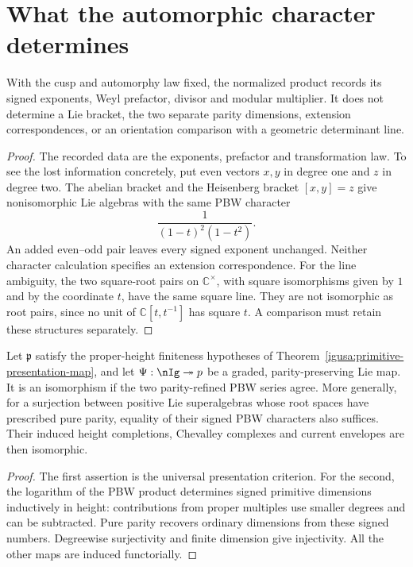 \section{What the automorphic character determines}
\begin{proposition}
With the cusp and automorphy law fixed, the normalized product
records its signed exponents, Weyl prefactor, divisor and modular
multiplier. It does not determine a Lie bracket, the two separate
parity dimensions, extension correspondences, or an orientation
comparison with a geometric determinant line.
\end{proposition}
\begin{proof}
The recorded data are the exponents, prefactor and transformation
law. To see the lost information concretely, put even vectors
\(x,y\) in degree one and \(z\) in degree two. The abelian
bracket and the Heisenberg bracket \([x,y]=z\) give nonisomorphic
Lie algebras with the same PBW character
\[
 \frac1{(1-t)^2(1-t^2)}.
\]
An added even--odd pair leaves every signed exponent unchanged.
Neither character calculation specifies an extension correspondence.
For the line ambiguity, the two square-root pairs on
\(\mathbb C^\times\), with square isomorphisms given by \(1\)
and by the coordinate \(t\), have the same square line. They
are not isomorphic as root pairs, since no unit of
\(\mathbb C[t,t^{-1}]\) has square \(t\). A comparison must
retain these structures separately.
\end{proof}

\begin{recognition}
Let \(\mathfrak p\) satisfy the proper-height finiteness hypotheses
of Theorem~\ref{igusa:primitive-presentation-map}, and let
\(\Psi:\nIg\twoheadrightarrow\mathfrak p\) be a graded,
parity-preserving Lie map. It is an isomorphism if the two
parity-refined PBW series agree. More generally, for a surjection
between positive Lie superalgebras whose root spaces have
prescribed pure parity, equality of their signed PBW characters
also suffices. Their induced height completions, Chevalley complexes
and current envelopes are then isomorphic.
\end{recognition}
\begin{proof}
The first assertion is the universal presentation criterion.
For the second, the logarithm of the PBW product determines signed
primitive dimensions inductively in height: contributions from
proper multiples use smaller degrees and can be subtracted.
Pure parity recovers ordinary dimensions from these signed
numbers. Degreewise surjectivity and finite dimension give
injectivity. All the other maps are induced functorially.
\end{proof}

